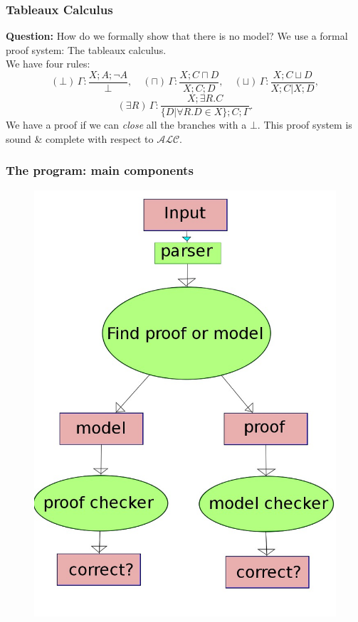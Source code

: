 \begin{frame}
  \frametitle{Tableaux Calculus}
  {\bf Question:} How do we formally show that there is no model?
  \pause
  \bigskip
  We use a formal proof system: The tableaux calculus. \\
  We have four rules:
  \[
  (\bot) \, \Gamma: \frac{X; A; \lnot A}{\bot}, \quad
  (\sqcap) \, \Gamma: \frac{X; C \sqcap D}{X; C; D}, \quad
  (\sqcup) \, \Gamma: \frac{X; C \sqcup D}{X; C | X; D},
  \]
  \[
  (\exists R) \, \Gamma: \frac{X; \exists R. C}{\{D | \forall R.D \in X\};  C ; \Gamma}.
  \]
  \pause
  We have a proof if we can \emph{close} all the branches with a $\bot$.
  \pause
  This proof system is sound \& complete with respect to $\mathcal{ALC}$.
\end{frame}

\begin{frame}
  \frametitle{The program: main components}
  \begin{figure}
  \begin{center}
    \includegraphics[scale=0.2]{design.jpeg}
  \end{center}
\end{figure}
\end{frame}

